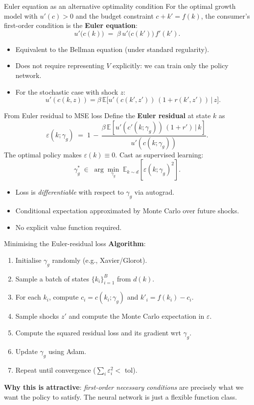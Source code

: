 \documentclass[10pt,english,aspectratio=169]{beamer}
\begin{document}
\begin{frame}{Euler equation as an alternative optimality condition}
For the optimal growth model with $u'(c) > 0$ and the budget constraint $c + k' = f(k)$, the consumer's first-order condition is the \textbf{Euler equation}:
\[
u'\!\big(c(k)\big) \;=\; \beta\, u'\!\big(c(k')\big)\, f'(k').
\]
\medskip
\begin{itemize}
\item Equivalent to the Bellman equation (under standard regularity).
\item Does not require representing $V$ explicitly: we can train only the policy network.
\item For the stochastic case with shock $z$:
\[
u'(c(k,z)) = \beta\,\mathbb{E}\big[u'(c(k',z'))\,(1+r(k',z'))\,\big|\,z\big].
\]
\end{itemize}
\end{frame}

\begin{frame}{From Euler residual to MSE loss}
Define the \textbf{Euler residual} at state $k$ as
\[
\varepsilon(k;\gamma_g) \;=\; 1 \,-\, \frac{\beta\,\mathbb{E}\!\left[u'(c'(k;\gamma_g))\,(1+r')\,\big|\,k\right]}{u'(c(k;\gamma_g))}.
\]
\medskip
The optimal policy makes $\varepsilon(k)\equiv 0$. Cast as supervised learning:
\[
\gamma_g^{*} \;\in\; \arg\min_{\gamma_g}\; \mathbb{E}_{k\sim d}\!\left[\varepsilon(k;\gamma_g)^2\right].
\]
\medskip
\begin{itemize}
\item Loss is \emph{differentiable} with respect to $\gamma_g$ via autograd.
\item Conditional expectation approximated by Monte Carlo over future shocks.
\item No explicit value function required.
\end{itemize}
\end{frame}

\begin{frame}{Minimising the Euler-residual loss}
\textbf{Algorithm}:
\begin{enumerate}
\item Initialise $\gamma_g$ randomly (e.g., Xavier/Glorot).
\item Sample a batch of states $\{k_i\}_{i=1}^B$ from $d(k)$.
\item For each $k_i$, compute $c_i = c(k_i;\gamma_g)$ and $k'_i = f(k_i) - c_i$.
\item Sample shocks $z'$ and compute the Monte Carlo expectation in $\varepsilon$.
\item Compute the squared residual loss and its gradient wrt $\gamma_g$.
\item Update $\gamma_g$ using Adam.
\item Repeat until convergence ($\sum_i \varepsilon_i^2 < $ tol).
\end{enumerate}
\medskip
\textbf{Why this is attractive}: \emph{first-order necessary conditions} are precisely what we want the policy to satisfy. The neural network is just a flexible function class.
\end{frame}
\end{document}
